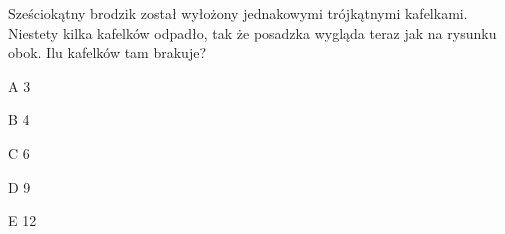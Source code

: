 \begin{tresc}
Sześciokątny brodzik został wyłożony jednakowymi trójkątnymi kafelkami. Niestety kilka kafelków odpadło, tak że posadzka wygląda teraz jak na rysunku obok. Ilu kafelków tam brakuje?
\end{tresc}
\begin{wariant}{A} 3 \end{wariant}
\begin{wariant}{B} 4 \end{wariant}
\begin{wariant}{C} 6 \end{wariant}
\begin{wariant}{D} 9 \end{wariant}
\begin{wariant}{E} 12 \end{wariant}
